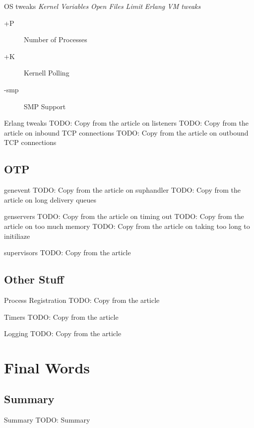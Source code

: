 \documentclass[utf8]{beamer}
\begin{document}
\begin{frame}{OS tweaks}
	\emph{Kernel Variables}
	\pause
	\emph{Open Files Limit}
	\ulimit
	\pause
	\emph{Erlang VM tweaks}
	\begin{description}
		\item[+P] Number of Processes
		\item[+K] Kernell Polling
		\item[-smp] SMP Support
	\end{description}
\end{frame}
\begin{frame}{Erlang tweaks}
	TODO: Copy from the article on listeners
	TODO: Copy from the article on inbound TCP connections
	TODO: Copy from the article on outbound TCP connections
\end{frame}
\subsection{OTP}
\begin{frame}{gen\textunderscore event}
	TODO: Copy from the article on sup\textunderscore handler
	TODO: Copy from the article on long delivery queues
\end{frame}
\begin{frame}{gen\textunderscore servers}
	TODO: Copy from the article on timing out
	TODO: Copy from the article on too much memory
	TODO: Copy from the article on taking too long to initiliaze
\end{frame}
\begin{frame}{supervisors}
	TODO: Copy from the article
\end{frame}
\subsection{Other Stuff}
\begin{frame}{Process Registration}
	TODO: Copy from the article
\end{frame}
\begin{frame}{Timers}
	TODO: Copy from the article
\end{frame}
\begin{frame}{Logging}
	TODO: Copy from the article
\end{frame}

\section{Final Words}
\subsection{Summary}
\begin{frame}{Summary}
	TODO: Summary
\end{frame}
\end{document}

